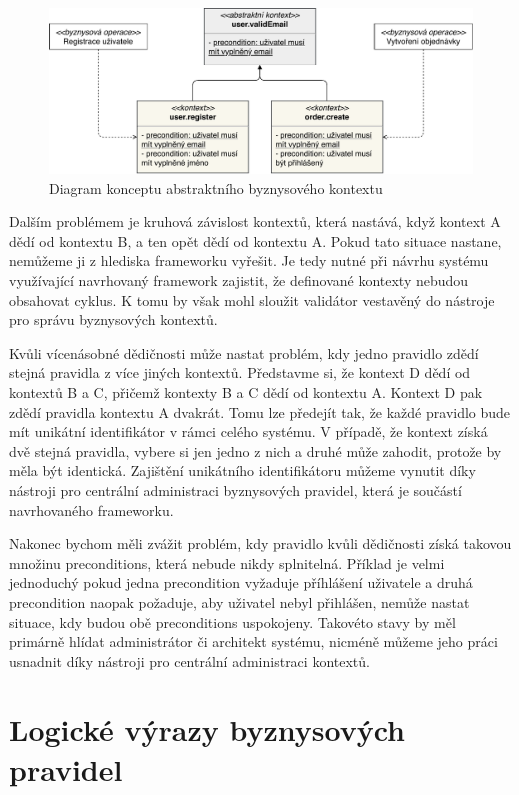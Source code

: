 \begin{figure}
    \centering
    \includegraphics[keepaspectratio=true, width=1\linewidth]{figures/abstract-context.pdf}
    \caption{Diagram konceptu abstraktního byznysového kontextu}
    \label{fig:abstract-context}
\end{figure}

Dalším problémem je kruhová závislost kontextů, která nastává, když kontext A dědí od kontextu B,
a ten opět dědí od kontextu A. Pokud tato situace nastane, nemůžeme ji z hlediska frameworku vyřešit.
Je tedy nutné při návrhu systému využívající navrhovaný framework zajistit, že definované kontexty
nebudou obsahovat cyklus. K tomu by však mohl sloužit validátor vestavěný do nástroje pro správu
byznysových kontextů.

Kvůli vícenásobné dědičnosti může nastat problém, kdy jedno pravidlo zdědí stejná pravidla z
více jiných kontextů. Představme si, že kontext D dědí od kontextů B a C, přičemž kontexty B a C dědí
od kontextu A. Kontext D pak zdědí pravidla kontextu A dvakrát. Tomu lze předejít tak, že
každé pravidlo bude mít unikátní identifikátor v rámci celého systému. V případě, že kontext
získá dvě stejná pravidla, vybere si jen jedno z nich a druhé může zahodit, protože by měla
být identická. Zajištění unikátního identifikátoru můžeme vynutit díky nástroji pro centrální
administraci byznysových pravidel, která je součástí navrhovaného frameworku.

Nakonec bychom měli zvážit problém, kdy pravidlo kvůli dědičnosti získá takovou množinu
preconditions, která nebude nikdy splnitelná. Příklad je velmi jednoduchý \textendash\xspace
pokud jedna precondition vyžaduje příhlášení uživatele a druhá precondition naopak požaduje,
aby uživatel nebyl přihlášen, nemůže nastat situace, kdy budou obě preconditions uspokojeny.
Takovéto stavy by měl primárně hlídat administrátor či architekt systému, nicméně můžeme
jeho práci usnadnit díky nástroji pro centrální administraci kontextů.

\section{Logické výrazy byznysových pravidel}

